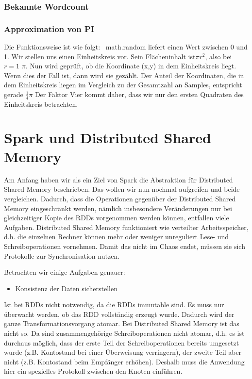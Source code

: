 \subsubsection{Bekannte Wordcount}



\subsubsection{Approximation von PI}


Die Funktionsweise ist wie folgt: \ math.random liefert einen Wert
zwischen 0 und 1. Wir stellen uns einen Einheitskreis vor. Sein
Flächeninhalt ist$\pi r^2$, also bei $r=1$ $\pi$. Nun wird geprüft, ob die Koordinate (x,y) in
dem Einheitskreis liegt. Wenn dies der Fall ist, dann wird sie gezählt.
Der Anteil der Koordinaten, die in dem Einheitskreis liegen im
Vergleich zu der Gesamtzahl an Samples, entspricht gerade
$\frac{1}{4}\pi$ Der Faktor Vier
kommt daher, dass wir nur den ersten Quadraten des Einheitskreis
betrachten.

\section[Spark und Distributed Shared
Memory]{\rmfamily Spark und Distributed Shared
Memory}
Am Anfang haben wir als ein Ziel von Spark die Abstraktion für
Distributed Shared Memory beschrieben. Das wollen wir nun nochmal
aufgreifen und beide vergleichen. Dadurch, dass die Operationen
gegenüber der Distributed Shared Memory eingeschränkt werden, nämlich
insbesondere Veränderungen nur bei gleichzeitiger Kopie des RDDs
vorgenommen werden können, entfallen viele Aufgaben. Distributed Shared
Memory funktioniert wie verteilter Arbeitsspeicher, d.h. die einzelnen
Rechner können mehr oder weniger unreguliert Lese- und
Schreiboperationen vornehmen. Damit das nicht im Chaos endet, müssen
sie sich Protokolle zur Synchronisation nutzen. 

Betrachten wir einige Aufgaben genauer:


\begin{itemize}
\item Konsistenz der Daten sicherstellen
\end{itemize}
Ist bei RDDs nicht notwendig, da die RDDs immutable sind. Es muss nur
überwacht werden, ob das RDD vollständig erzeugt wurde. Dadurch wird der
ganze Transformationsvorgang atomar. Bei Distributed Shared Memory ist
das nicht so. Da sind zusammengehörige Schreiboperationen nicht atomar,
d.h. es ist durchaus möglich, dass der erste Teil der
Schreiboperationen bereits umgesetzt wurde (z.B. Kontostand bei einer
Überweisung verringern), der zweite Teil aber nicht (z.B. Kontostand
beim Empfänger erhöhen). Deshalb muss die Anwendung hier ein spezielles
Protokoll zwischen den Knoten einführen.

